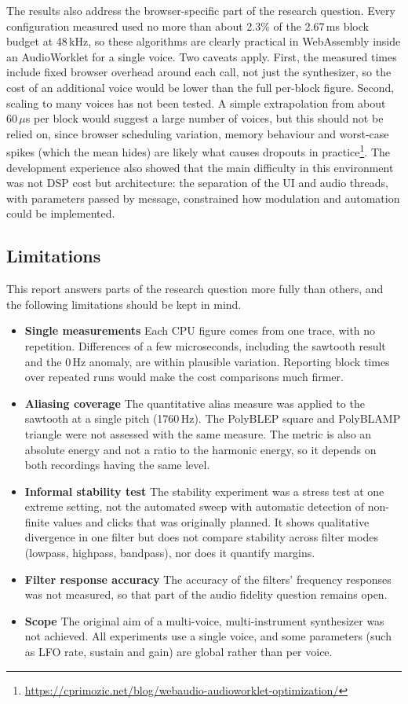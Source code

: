 The results also address the browser-specific part of the research question. Every configuration measured used no more than about 2.3\% of the 2.67\,ms block budget at 48\,kHz, so these algorithms are clearly practical in WebAssembly inside an AudioWorklet for a single voice. Two caveats apply. First, the measured times include fixed browser overhead around each call, not just the synthesizer, so the cost of an additional voice would be lower than the full per-block figure. Second, scaling to many voices has not been tested. A simple extrapolation from about 60\,$\mu$s per block would suggest a large number of voices, but this should not be relied on, since browser scheduling variation, memory behaviour and worst-case spikes (which the mean hides) are likely what causes dropouts in 
practice\footnote{\url{https://cprimozic.net/blog/webaudio-audioworklet-optimization/}}. The development experience also showed that the main difficulty in this environment was not DSP cost but architecture: the separation of the UI and audio threads, with parameters passed by message, constrained how modulation and automation could be implemented.

\subsection{Limitations}

This report answers parts of the research question more fully than others, and the following limitations should be kept in mind.
\begin{itemize}
  \item \textbf{Single measurements} Each CPU figure comes from one trace, with no repetition. Differences of a few microseconds, including the sawtooth result and the 0\,Hz anomaly, are within plausible variation. Reporting block times over repeated runs would make the cost comparisons much firmer.
  \item \textbf{Aliasing coverage} The quantitative alias measure was applied to the sawtooth at a single pitch (1760\,Hz). The PolyBLEP square and PolyBLAMP triangle were not assessed with the same measure. The metric is also an absolute energy and not a ratio to the harmonic energy, so it depends on both recordings having the same level.
  \item \textbf{Informal stability test} The stability experiment was a stress test at one extreme setting, not the automated sweep with automatic detection of non-finite values and clicks that was originally planned. It shows qualitative divergence in one filter but does not compare stability across filter modes (lowpass, highpass, bandpass), nor does it quantify margins.
  \item \textbf{Filter response accuracy} The accuracy of the filters' frequency responses was not measured, so that part of the audio fidelity question remains open.
  \item \textbf{Scope} The original aim of a multi-voice, multi-instrument synthesizer was not achieved. All experiments use a single voice, and some parameters (such as LFO rate, sustain and gain) are global rather than per voice.
\end{itemize}

